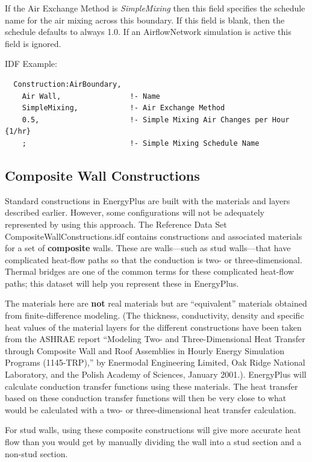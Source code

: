 If the Air Exchange Method is \textit{SimpleMixing} then this field specifies the schedule name for the air mixing across this boundary. If this field is blank, then the schedule defaults to always 1.0. If an AirflowNetwork simulation is active this field is ignored.

IDF Example:

\begin{lstlisting}
  Construction:AirBoundary,
    Air Wall,                !- Name
    SimpleMixing,            !- Air Exchange Method
    0.5,                     !- Simple Mixing Air Changes per Hour {1/hr}
    ;                        !- Simple Mixing Schedule Name
\end{lstlisting}

\subsection{Composite Wall Constructions}\label{composite-wall-constructions}

Standard constructions in EnergyPlus are built with the materials and layers described earlier. However, some configurations will not be adequately represented by using this approach. The Reference Data Set CompositeWallConstructions.idf contains constructions and associated materials for a set of \textbf{composite} walls. These are walls---such as stud walls---that have complicated heat-flow paths so that the conduction is two- or three-dimensional. Thermal bridges are one of the common terms for these complicated heat-flow paths; this dataset will help you represent these in EnergyPlus.

The materials here are \textbf{not} real materials but are ``equivalent'' materials obtained from finite-difference modeling. (The thickness, conductivity, density and specific heat values of the material layers for the different constructions have been taken from the ASHRAE report ``Modeling Two- and Three-Dimensional Heat Transfer through Composite Wall and Roof Assemblies in Hourly Energy Simulation Programs (1145-TRP),'' by Enermodal Engineering Limited, Oak Ridge National Laboratory, and the Polish Academy of Sciences, January 2001.). EnergyPlus will calculate conduction transfer functions using these materials. The heat transfer based on these conduction transfer functions will then be very close to what would be calculated with a two- or three-dimensional heat transfer calculation.

For stud walls, using these composite constructions will give more accurate heat flow than you would get by manually dividing the wall into a stud section and a non-stud section.

